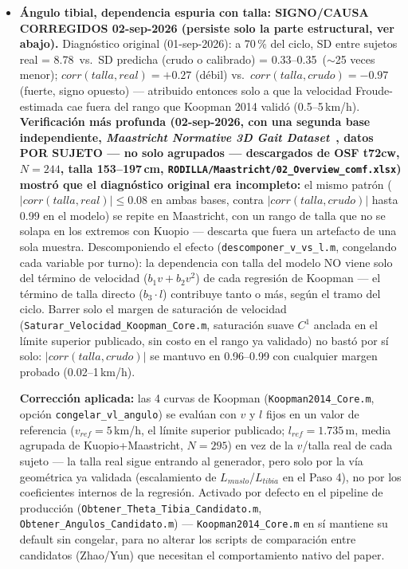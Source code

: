 \documentclass[11pt,a4paper]{scrartcl}
\begin{document}
\begin{itemize}
    \item \textbf{Ángulo tibial, dependencia espuria con talla: SIGNO/CAUSA CORREGIDOS 02-sep-2026 (persiste solo la parte estructural, ver abajo).} Diagnóstico original (01-sep-2026): a 70\,\% del ciclo, SD entre sujetos real = 8.78\textdegree\ vs.\ SD predicha (crudo o calibrado) = 0.33--0.35\textdegree\ (${\sim}$25 veces menor); $corr(talla,real)=+0.27$ (débil) vs.\ $corr(talla,crudo)=-0.97$ (fuerte, signo opuesto) --- atribuido entonces solo a que la velocidad Froude-estimada cae fuera del rango que Koopman 2014 validó (0.5--5\,km/h). \textbf{Verificación más profunda (02-sep-2026, con una segunda base independiente, \emph{Maastricht Normative 3D Gait Dataset}~\cite{Senden2024}, datos POR SUJETO --- no solo agrupados --- descargados de OSF t72cw, $N=244$, talla 153--197\,cm, \texttt{RODILLA/Maastricht/02\_Overview\_comf.xlsx}) mostró que el diagnóstico original era incompleto:} el mismo patrón ($|corr(talla,real)|\le0.08$ en ambas bases, contra $|corr(talla,crudo)|$ hasta 0.99 en el modelo) se repite en Maastricht, con un rango de talla que no se solapa en los extremos con Kuopio --- descarta que fuera un artefacto de una sola muestra. Descomponiendo el efecto (\texttt{descomponer\_v\_vs\_l.m}, congelando cada variable por turno): la dependencia con talla del modelo NO viene solo del término de velocidad ($b_1v+b_2v^2$) de cada regresión de Koopman --- el término de talla directo ($b_3\cdot l$) contribuye tanto o más, según el tramo del ciclo. Barrer solo el margen de saturación de velocidad (\texttt{Saturar\_Velocidad\_Koopman\_Core.m}, saturación suave $C^1$ anclada en el límite superior publicado, sin costo en el rango ya validado) no bastó por sí solo: $|corr(talla,crudo)|$ se mantuvo en 0.96--0.99 con cualquier margen probado (0.02--1\,km/h).

    \textbf{Corrección aplicada:} las 4 curvas de Koopman (\texttt{Koopman2014\_Core.m}, opción \texttt{congelar\_vl\_angulo}) se evalúan con $v$ y $l$ fijos en un valor de referencia ($v_{ref}=5$\,km/h, el límite superior publicado; $l_{ref}=1.735$\,m, media agrupada de Kuopio+Maastricht, $N=295$) en vez de la $v$/talla real de cada sujeto --- la talla real sigue entrando al generador, pero solo por la vía geométrica ya validada (escalamiento de $L_{muslo}$/$L_{tibia}$ en el Paso 4), no por los coeficientes internos de la regresión. Activado por defecto en el pipeline de producción (\texttt{Obtener\_Theta\_Tibia\_Candidato.m}, \texttt{Obtener\_Angulos\_Candidato.m}) --- \texttt{Koopman2014\_Core.m} en sí mantiene su default sin congelar, para no alterar los scripts de comparación entre candidatos (Zhao/Yun) que necesitan el comportamiento nativo del paper.


\end{itemize}
\end{document}
